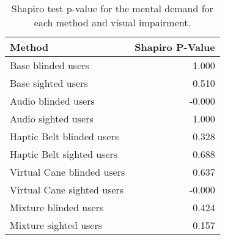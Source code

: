
\begin{table}[!htb]
\centering
\caption{Shapiro test p-value for the mental demand for each method and visual impairment.}
\label{tab:shapiro_mental_demand}
\begin{tabular}{lr}
\toprule
                    Method &  Shapiro P-Value \\
\midrule
        Base blinded users &            1.000 \\
        Base sighted users &            0.510 \\
       Audio blinded users &           -0.000 \\
       Audio sighted users &            1.000 \\
 Haptic Belt blinded users &            0.328 \\
 Haptic Belt sighted users &            0.688 \\
Virtual Cane blinded users &            0.637 \\
Virtual Cane sighted users &           -0.000 \\
     Mixture blinded users &            0.424 \\
     Mixture sighted users &            0.157 \\
\bottomrule
\end{tabular}
\end{table}

